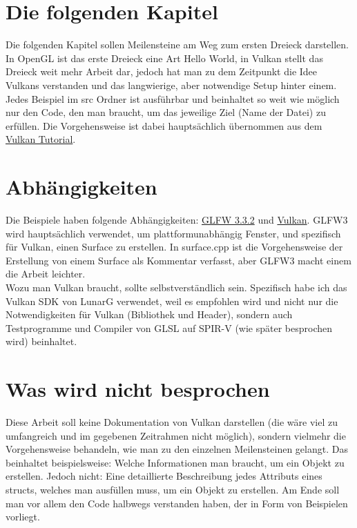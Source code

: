 \documentclass[11pt,a4paper]{report}
\begin{document}
\section{Die folgenden Kapitel}
Die folgenden Kapitel sollen Meilensteine am Weg zum ersten Dreieck darstellen. In OpenGL ist das erste Dreieck eine Art Hello World, in Vulkan stellt das Dreieck weit mehr Arbeit dar, jedoch hat man zu dem Zeitpunkt die Idee Vulkans verstanden und das langwierige, aber notwendige Setup hinter einem.\\
Jedes Beispiel im src Ordner ist ausführbar und beinhaltet so weit wie möglich nur den Code, den man braucht, um das jeweilige Ziel (Name der Datei) zu erfüllen. Die Vorgehensweise ist dabei hauptsächlich übernommen aus dem \href{https://vulkan-tutorial.com}{Vulkan Tutorial}.

\section{Abhängigkeiten}
Die Beispiele haben folgende Abhängigkeiten: \href{https://www.glfw.org/download.html}{GLFW 3.3.2} und \href{https://vulkan.lunarg.com}{Vulkan}. GLFW3 wird hauptsächlich verwendet, um plattformunabhängig Fenster, und spezifisch für Vulkan, einen Surface zu erstellen. In surface.cpp ist die Vorgehensweise der Erstellung von einem Surface als Kommentar verfasst, aber GLFW3 macht einem die Arbeit leichter.\\
Wozu man Vulkan braucht, sollte selbstverständlich sein. Spezifisch habe ich das Vulkan SDK von LunarG verwendet, weil es empfohlen wird und nicht nur die Notwendigkeiten für Vulkan (Bibliothek und Header), sondern auch Testprogramme und Compiler von GLSL auf SPIR-V (wie später besprochen wird) beinhaltet.

\section{Was wird nicht besprochen}
Diese Arbeit soll keine Dokumentation von Vulkan darstellen (die wäre viel zu umfangreich und im gegebenen Zeitrahmen nicht möglich), sondern vielmehr die Vorgehensweise behandeln, wie man zu den einzelnen Meilensteinen gelangt. Das beinhaltet beispielsweise: Welche Informationen man braucht, um ein Objekt zu erstellen. Jedoch nicht: Eine detaillierte Beschreibung jedes Attributs eines structs, welches man ausfüllen muss, um ein Objekt zu erstellen. Am Ende soll man vor allem den Code halbwegs verstanden haben, der in Form von Beispielen vorliegt.
\end{document}
